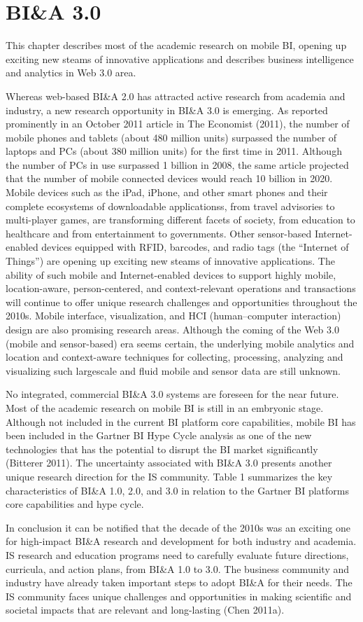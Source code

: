 \section{BI\&A 3.0}
This chapter describes most of the academic research on mobile BI, opening up exciting new steams of innovative applications and describes business intelligence and analytics in Web 3.0 area.

Whereas web-based BI\&A 2.0 has attracted active research
from academia and industry, a new research opportunity in
BI\&A 3.0 is emerging. As reported prominently in an
October 2011 article in The Economist (2011), the number of
mobile phones and tablets (about 480 million units) surpassed
the number of laptops and PCs (about 380 million units) for
the first time in 2011. Although the number of PCs in use
surpassed 1 billion in 2008, the same article projected that the
number of mobile connected devices would reach 10 billion
in 2020. Mobile devices such as the iPad, iPhone, and other
smart phones and their complete ecosystems of downloadable
applicationss, from travel advisories to multi-player games,
are transforming different facets of society, from education to
healthcare and from entertainment to governments. Other
sensor-based Internet-enabled devices equipped with RFID,
barcodes, and radio tags (the “Internet of Things”) are
opening up exciting new steams of innovative applications.
The ability of such mobile and Internet-enabled devices to
support highly mobile, location-aware, person-centered, and
context-relevant operations and transactions will continue to
offer unique research challenges and opportunities throughout
the 2010s. Mobile interface, visualization, and HCI
(human–computer interaction) design are also promising
research areas. Although the coming of the Web 3.0 (mobile
and sensor-based) era seems certain, the underlying mobile
analytics and location and context-aware techniques for
collecting, processing, analyzing and visualizing such largescale
and fluid mobile and sensor data are still unknown.

No integrated, commercial BI\&A 3.0 systems are foreseen for
the near future. Most of the academic research on mobile BI
is still in an embryonic stage. Although not included in the
current BI platform core capabilities, mobile BI has been
included in the Gartner BI Hype Cycle analysis as one of the
new technologies that has the potential to disrupt the BI
market significantly (Bitterer 2011). The uncertainty associated
with BI\&A 3.0 presents another unique research
direction for the IS community.
Table 1 summarizes the key characteristics of BI\&A 1.0, 2.0,
and 3.0 in relation to the Gartner BI platforms core capabilities
and hype cycle.

In conclusion it can be notified that the decade of the 2010s was an exciting one for high-impact BI\&A research and development for both industry and academia. IS research and education programs
need to carefully evaluate future directions, curricula,
and action plans, from BI\&A 1.0 to 3.0. The business community and industry have already taken important steps to adopt BI\&A for their needs. The IS community faces unique challenges and opportunities
in making scientific and societal impacts that are relevant and
long-lasting (Chen 2011a). 